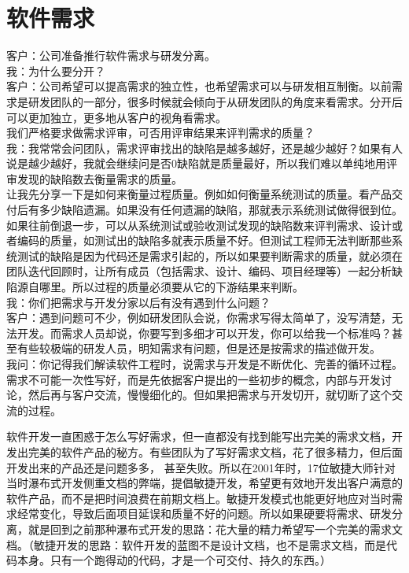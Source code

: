 \chapter{软件需求} %
客户：公司准备推行软件需求与研发分离。\\
我：为什么要分开？\\
客户：公司希望可以提高需求的独立性，也希望需求可以与研发相互制衡。以前需求是研发团队的一部分，很多时候就会倾向于从研发团队的角度来看需求。分开后可以更加独立，更多地从客户的视角看需求。\\
我们严格要求做需求评审，可否用评审结果来评判需求的质量？\\
我：我常常会问团队，需求评审找出的缺陷是越多越好，还是越少越好？如果有人说是越少越好，我就会继续问是否0缺陷就是质量最好，所以我们难以单纯地用评审发现的缺陷数去衡量需求的质量。\\
让我先分享一下是如何来衡量过程质量。例如如何衡量系统测试的质量。看产品交付后有多少缺陷遗漏。如果没有任何遗漏的缺陷，那就表示系统测试做得很到位。如果往前倒退一步，可以从系统测试或验收测试发现的缺陷数来评判需求、设计或者编码的质量，如测试出的缺陷多就表示质量不好。但测试工程师无法判断那些系统测试的缺陷是因为代码还是需求引起的，所以如果要判断需求的质量，就必须在团队迭代回顾时，让所有成员（包括需求、设计、编码、项目经理等）一起分析缺陷源自哪里。所以过程的质量必须要从它的下游结果来判断。\\
我：你们把需求与开发分家以后有没有遇到什么问题？\\
客户：遇到问题可不少，例如研发团队会说，你需求写得太简单了，没写清楚，无法开发。而需求人员却说，你要写到多细才可以开发，你可以给我一个标准吗？甚至有些较极端的研发人员，明知需求有问题，但是还是按需求的描述做开发。\\
我问：你记得我们解读软件工程时，说需求与开发是不断优化、完善的循环过程。需求不可能一次性写好，而是先依据客户提出的一些初步的概念，内部与开发讨论，然后再与客户交流，慢慢细化的。但如果把需求与开发切开，就切断了这个交流的过程。

软件开发一直困惑于怎么写好需求，但一直都没有找到能写出完美的需求文档，开发出完美的软件产品的秘方。有些团队为了写好需求文档，花了很多精力，但后面开发出来的产品还是问题多多，
甚至失败。所以在2001年时，17位敏捷大师针对当时瀑布式开发侧重文档的弊端，提倡敏捷开发，希望更有效地开发出客户满意的软件产品，而不是把时间浪费在前期文档上。敏捷开发模式也能更好地应对当时需求经常变化，导致后面项目延误和质量不好的问题。所以如果硬要将需求、研发分离，就是回到之前那种瀑布式开发的思路：花大量的精力希望写一个完美的需求文档。（敏捷开发的思路：软件开发的蓝图不是设计文档，也不是需求文档，而是代码本身。只有一个跑得动的代码，才是一个可交付、持久的东西。）


